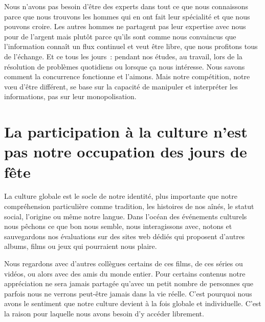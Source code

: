Nous n’avons pas besoin d’être des experts dans tout ce que nous connaissons parce que nous trouvons les hommes qui en ont fait leur spécialité et que nous pouvons croire. Les autres hommes ne
partagent pas leur expertise avec nous pour de l’argent mais plutôt parce qu’ils sont comme nous convaincus que l’information connaît un flux continuel et veut être libre, que nous profitons tous de
l’échange. Et ce tous les jours~: pendant nos études, au travail, lors de la résolution de problèmes quotidiens ou lorsque ça nous intéresse. Nous savons comment la concurrence fonctionne et l’aimons.
Mais notre compétition, notre vœu d’être différent, se base sur la capacité de manipuler et interpréter les informations, pas sur leur monopolisation.

\section{La participation à la culture n’est pas notre occupation des jours de fête}
La culture globale est le socle de notre identité, plus importante que notre compréhension particulière comme
tradition, les histoires de nos aînés, le statut social, l’origine ou même notre langue. Dans l’océan des événements culturels nous pêchons ce que bon nous semble, nous interagissons avec, notons et
sauvegardons nos évaluations sur des sites web dédiés qui proposent d’autres albums, films ou jeux qui pourraient nous plaire.

Nous regardons avec d’autres collègues certains de ces films, de ces séries ou vidéos, ou alors avec des amis du monde entier. Pour certains contenus notre appréciation ne sera jamais partagée qu’avec
un petit nombre de personnes que parfois nous ne verrons peut-être jamais dans la vie réelle. C’est pourquoi nous avons le sentiment que notre culture devient à la fois globale et individuelle. C’est
la raison pour laquelle nous avons besoin d’y accéder librement.

